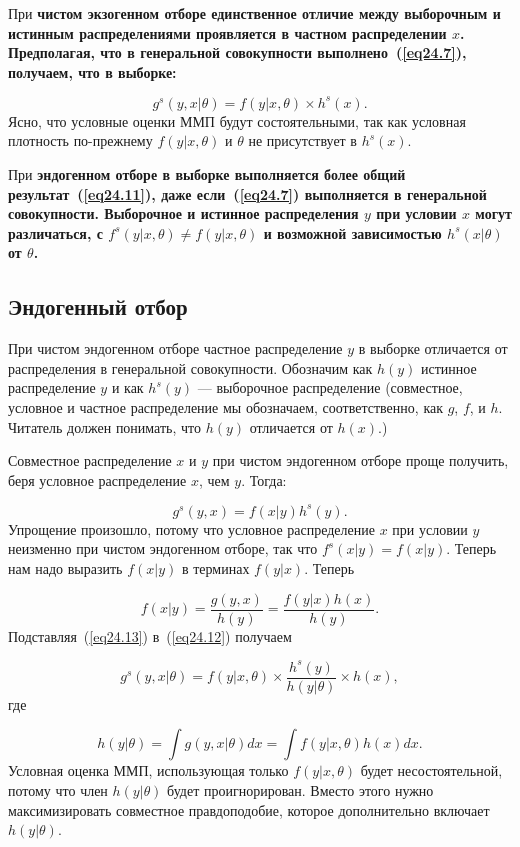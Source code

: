 При \bfseries чистом экзогенном отборе \mdseries единственное отличие между выборочным и истинным распределениями проявляется в частном распределении $x$. Предполагая, что в генеральной совокупности выполнено~(\ref{eq24.7}), получаем, что в выборке:

$$
g^s(y,x|\theta) = f(y|x,\theta) \times h^s(x).
$$
Ясно, что условные оценки ММП будут состоятельными, так как условная плотность по-прежнему $f(y|x,\theta)$ и $\theta$ не присутствует в $h^s(x)$. 

При \bfseries эндогенном отборе \mdseries в выборке выполняется более общий результат~(\ref{eq24.11}), даже если~(\ref{eq24.7}) выполняется в генеральной совокупности. Выборочное и истинное распределения $y$ при условии $x$ могут различаться, с $f^s(y|x,\theta) \ne f(y|x,\theta)$ и возможной зависимостью $h^s(x|\theta)$ от $\theta$.  

\subsection{Эндогенный отбор}

При чистом эндогенном отборе частное распределение $y$ в выборке отличается от распределения в генеральной совокупности. Обозначим как $h(y)$ истинное распределение $y$ и как $h^s(y)$ --- выборочное распределение (совместное, условное и частное распределение мы обозначаем, соответственно, как $g$, $f$, и $h$. Читатель должен понимать, что $h(y)$ отличается от $h(x)$.)

Совместное распределение $x$ и $y$ при чистом эндогенном отборе проще получить, беря условное распределение $x$, чем $y$. Тогда:

\begin{equation}
\label{eq24.12}
g^s(y,x) = f(x|y) h^s(y).
\end{equation}
Упрощение произошло, потому что условное распределение $x$ при условии $y$ неизменно при чистом эндогенном отборе, так что $f^s (x|y) = f(x|y)$. Теперь нам надо выразить $f(x|y)$ в терминах $f(y|x)$. Теперь

\begin{equation}
\label{eq24.13}
f(x|y) = \frac{g(y,x)}{h(y)} = \frac{f(y|x)h(x)}{h(y)}.
\end{equation}
Подставляя~(\ref{eq24.13}) в~(\ref{eq24.12}) получаем

$$
g^s(y,x|\theta) = f(y|x, \theta) \times \frac{h^s(y)}{h(y|\theta)} \times h(x),
$$
где

$$
h(y|\theta) = \int g(y,x|\theta) dx = \int f(y|x,\theta) h(x) dx. 
$$
Условная оценка ММП, использующая только $f(y|x,\theta)$ будет несостоятельной, потому что член $h(y|\theta)$ будет проигнорирован. Вместо этого нужно максимизировать совместное правдоподобие, которое дополнительно включает $h(y|\theta)$. 

